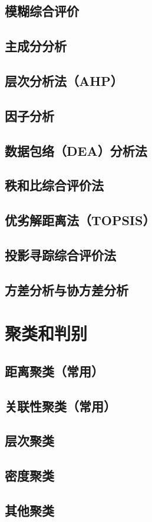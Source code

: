 \documentclass[openany]{progbookcn}
\begin{document}
\section{模糊综合评价}
\section{主成分分析}
\section{层次分析法（AHP）}
\section{因子分析}
\section{数据包络（DEA）分析法}
\section{秩和比综合评价法}
\section{优劣解距离法（TOPSIS）}
\section{投影寻踪综合评价法}
\section{方差分析与协方差分析}
\chapter{聚类和判别}
\section{距离聚类（常用）}
\section{关联性聚类（常用）}
\section{层次聚类}
\section{密度聚类}
\section{其他聚类}
\end{document}
